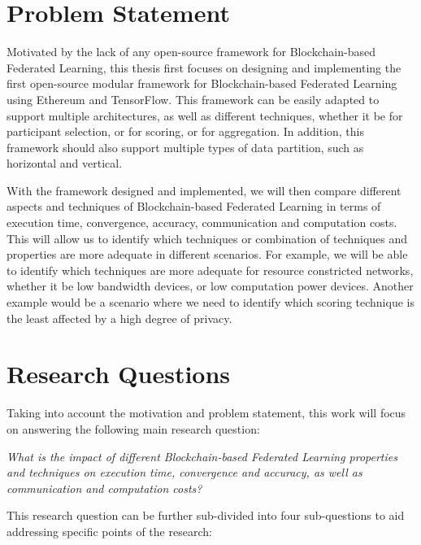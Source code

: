 \section{Problem Statement}\label{intro:problem}

Motivated by the lack of any open-source framework for Blockchain-based Federated Learning, this thesis first focuses on designing and implementing the first open-source modular framework for Blockchain-based Federated Learning using Ethereum and TensorFlow. This framework can be easily adapted to support multiple architectures, as well as different techniques, whether it be for participant selection, or for scoring, or for aggregation. In addition, this framework should also support multiple types of data partition, such as horizontal and vertical.

With the framework designed and implemented, we will then compare different aspects and techniques of Blockchain-based Federated Learning in terms of execution time, convergence, accuracy, communication and computation costs. This will allow us to identify which techniques or combination of techniques and properties are more adequate in different scenarios. For example, we will be able to identify which techniques are more adequate for resource constricted networks, whether it be low bandwidth devices, or low computation power devices. Another example would be a scenario where we need to identify which scoring technique is the least affected by a high degree of privacy.

\section{Research Questions}\label{intro:questions}

Taking into account the motivation and problem statement, this work will focus on answering the following main research question:

\begin{center}
    \textit{What is the impact of different Blockchain-based Federated Learning properties and techniques on execution time, convergence and accuracy, as well as communication and computation costs?}
\end{center}

This research question can be further sub-divided into four sub-questions to aid addressing specific points of the research:

